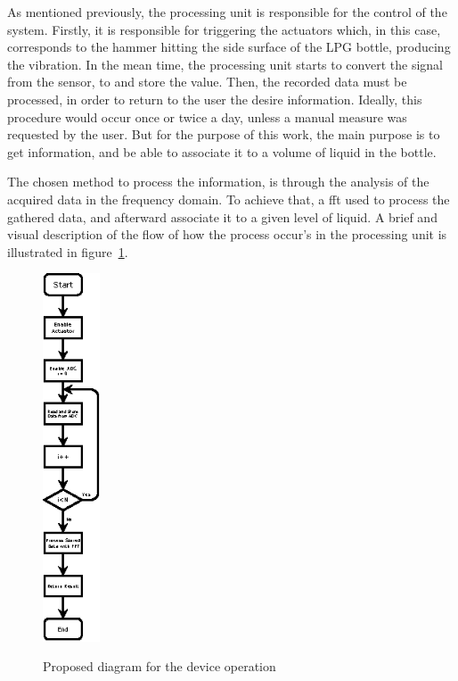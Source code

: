 As mentioned previously, the processing unit is responsible for the control of the system. Firstly, it is responsible for triggering the actuators which, in this case, corresponds to the hammer hitting the side surface of the LPG bottle, producing the vibration. In the mean time, the processing unit starts to convert the signal from the sensor, to and store the value. Then, the recorded data must be processed, in order to return to the user the desire information. Ideally, this procedure would occur once or twice a day, unless a manual measure was requested by the user. But for the purpose of this work, the main purpose is to get information, and be able to associate it to a volume of liquid in the bottle.

The chosen method to process the information, is through the analysis of the acquired data in the frequency domain. To achieve that, a \acrshort{fft} used to process the gathered data, and afterward associate it to a given level of liquid. A brief and visual description of the flow of how the process occur’s in the processing unit is illustrated in figure~\ref{fig:systemSWFlow}.

\begin{figure}[]
    \centering
    \includegraphics[width=0.15\textwidth]{Chapters/3CHP/Images/fluxogramArchProp.eps}
    \caption{Proposed diagram for the device operation}{}
    \label{fig:systemSWFlow}
\end{figure}

